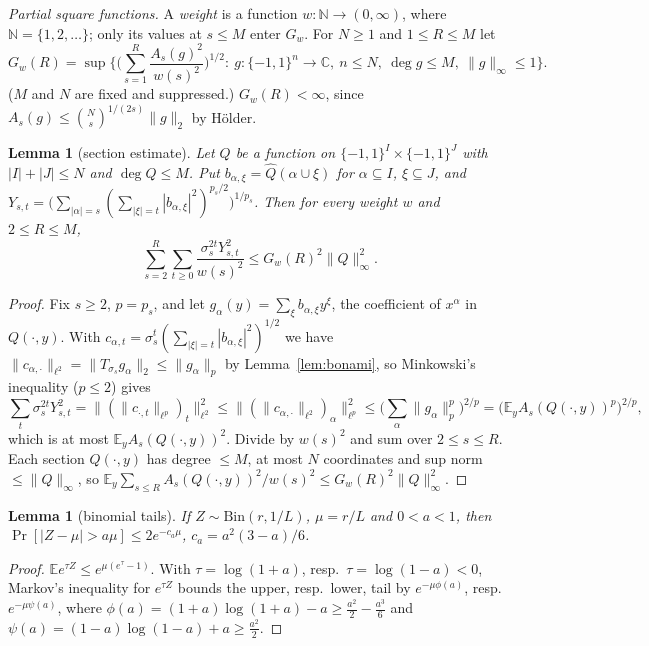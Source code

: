 \documentclass[11pt]{amsart}
\newtheorem{lemma}[theorem]{Lemma}
\theoremstyle{definition}
\newcommand{\C}{\mathbb{C}}
\newcommand{\N}{\mathbb{N}}
\newcommand{\E}{\mathbb{E}}
\begin{document}
\smallskip\noindent\emph{Partial square functions.} A \emph{weight} is a function $w:\N\to(0,\infty)$, where $\N=\{1,2,\dots\}$; only its values at $s\le M$ enter $G_w$. For $N\ge1$ and $1\le R\le M$ let
\[
G_w(R)=\sup\Big\{\Big(\sum_{s=1}^{R}\frac{A_s(g)^2}{w(s)^2}\Big)^{1/2}:\ g:\{-1,1\}^n\to\C,\ n\le N,\ \deg g\le M,\ \|g\|_\infty\le1\Big\}.
\]
($M$ and $N$ are fixed and suppressed.) $G_w(R)<\infty$, since $A_s(g)\le\binom Ns^{1/(2s)}\|g\|_2$ by H\"older.

\begin{lemma}[section estimate]\label{lem:section}
Let $Q$ be a function on $\{-1,1\}^I\times\{-1,1\}^J$ with $|I|+|J|\le N$ and $\deg Q\le M$. Put $b_{\alpha,\xi}=\widehat Q(\alpha\cup\xi)$ for $\alpha\subseteq I$, $\xi\subseteq J$, and
$Y_{s,t}=\big(\sum_{|\alpha|=s}(\sum_{|\xi|=t}|b_{\alpha,\xi}|^2)^{p_s/2}\big)^{1/p_s}$. Then for every weight $w$ and $2\le R\le M$,
\[
\sum_{s=2}^{R}\sum_{t\ge0}\frac{\sigma_s^{2t}Y_{s,t}^2}{w(s)^2}\le G_w(R)^2\|Q\|_\infty^2 .
\]
\end{lemma}

\begin{proof}
Fix $s\ge2$, $p=p_s$, and let $g_\alpha(y)=\sum_\xi b_{\alpha,\xi}y^\xi$, the coefficient of $x^\alpha$ in $Q(\cdot,y)$. With $c_{\alpha,t}=\sigma_s^t(\sum_{|\xi|=t}|b_{\alpha,\xi}|^2)^{1/2}$ we have $\|c_{\alpha,\cdot}\|_{\ell^2}=\|T_{\sigma_s}g_\alpha\|_2\le\|g_\alpha\|_p$ by Lemma~\ref{lem:bonami}, so Minkowski's inequality ($p\le2$) gives
\[
\sum_t\sigma_s^{2t}Y_{s,t}^2=\big\|(\|c_{\cdot,t}\|_{\ell^p})_t\big\|_{\ell^2}^2\le\big\|(\|c_{\alpha,\cdot}\|_{\ell^2})_\alpha\big\|_{\ell^p}^2\le\Big(\sum_\alpha\|g_\alpha\|_p^p\Big)^{2/p}=\big(\E_yA_s(Q(\cdot,y))^p\big)^{2/p},
\]
which is at most $\E_yA_s(Q(\cdot,y))^2$. Divide by $w(s)^2$ and sum over $2\le s\le R$. Each section $Q(\cdot,y)$ has degree $\le M$, at most $N$ coordinates and sup norm $\le\|Q\|_\infty$, so $\E_y\sum_{s\le R}A_s(Q(\cdot,y))^2/w(s)^2\le G_w(R)^2\|Q\|_\infty^2$.
\end{proof}

\begin{lemma}[binomial tails]\label{lem:tails}
If $Z\sim\mathrm{Bin}(r,1/L)$, $\mu=r/L$ and $0<a<1$, then $\Pr[|Z-\mu|>a\mu]\le2e^{-c_a\mu}$, $c_a=a^2(3-a)/6$.
\end{lemma}

\begin{proof}
$\E e^{\tau Z}\le e^{\mu(e^\tau-1)}$. With $\tau=\log(1+a)$, resp.\ $\tau=\log(1-a)<0$, Markov's inequality for $e^{\tau Z}$ bounds the upper, resp.\ lower, tail by $e^{-\mu\phi(a)}$, resp.\ $e^{-\mu\psi(a)}$, where $\phi(a)=(1+a)\log(1+a)-a\ge\frac{a^2}2-\frac{a^3}6$ and $\psi(a)=(1-a)\log(1-a)+a\ge\frac{a^2}2$.
\end{proof}
\end{document}
